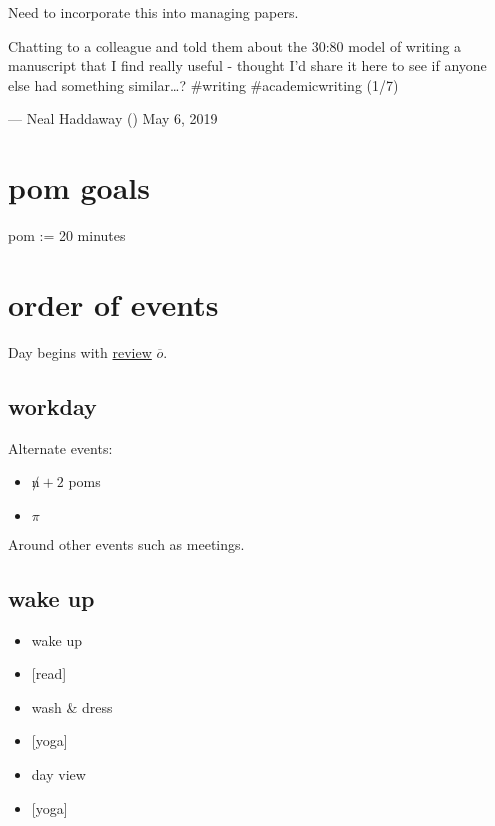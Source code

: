 \documentclass[]{book}
\providecommand{\tightlist}{%
  \setlength{\itemsep}{0pt}\setlength{\parskip}{0pt}}
\begin{document}
Need to incorporate this into managing papers.

Chatting to a colleague and told them about the 30:80 model of writing a manuscript that I find really useful - thought I'd share it here to see if anyone else had something similar\ldots{}? \#writing \#academicwriting (1/7)

--- Neal Haddaway (\citet{nealhaddaway}) May 6, 2019

\hypertarget{pom-goals}{%
\section{pom goals}\label{pom-goals}}

pom := 20 minutes

\hypertarget{order-of-events}{%
\section{order of events}\label{order-of-events}}

Day begins with \protect\hyperlink{review}{review} \(\overline o\).

\hypertarget{workday}{%
\subsection{workday}\label{workday}}

Alternate events:

\begin{itemize}
\tightlist
\item
  \(\not n + 2\) poms
\item
  \(\pi\)
\end{itemize}

Around other events such as meetings.

\hypertarget{wake-up}{%
\subsection{wake up}\label{wake-up}}

\begin{itemize}
\tightlist
\item
  wake up
\item
  {[}read{]}
\item
  wash \& dress
\item
  {[}yoga{]}
\item
  \protect\hypertarget{day-view}{}{day view}
\item
  {[}yoga{]}
\end{itemize}
\end{document}
